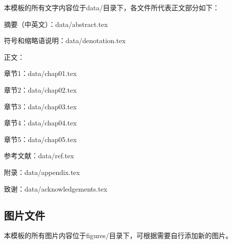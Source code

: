 本模板的所有文字内容位于data/目录下，各文件所代表正文部分如下：

摘要（中英文）：data/abstract.tex

符号和缩略语说明：data/denotation.tex

正文：

\indent \indent 章节1：data/chap01.tex

\indent \indent 章节2：data/chap02.tex

\indent \indent 章节3：data/chap03.tex

\indent \indent 章节4：data/chap04.tex

\indent \indent 章节5：data/chap05.tex

参考文献：data/ref.tex

附录：data/appendix.tex

致谢：data/acknowledgements.tex


\subsection{图片文件}

本模板的所有图片内容位于figures/目录下，可根据需要自行添加新的图片。

